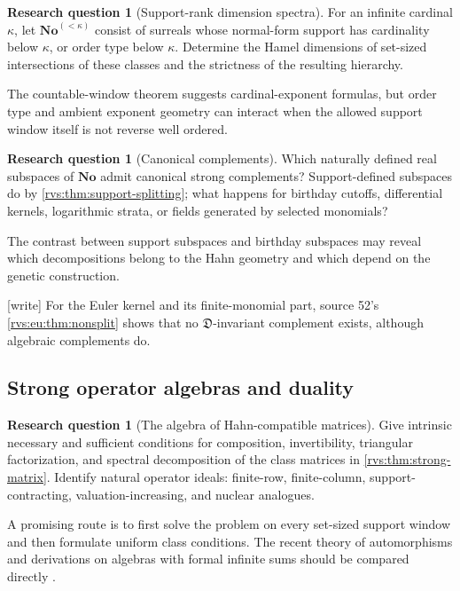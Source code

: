 \documentclass[11pt,letterpaper]{article}
\numberwithin{equation}{section}
\theoremstyle{definition}
\newtheorem{question}[theorem]{Research question}
\theoremstyle{remark}
\newcommand{\No}{\mathbf{No}}
\newcommand{\EuD}{\mathfrak D}%
\newcommand{\wtag}{\textup{[write]}}%
\begin{document}
\begin{question}[Support-rank dimension spectra]
For an infinite cardinal \(\kappa\), let \(\No^{(<\kappa)}\) consist of
surreals whose normal-form support has cardinality below \(\kappa\), or order
type below \(\kappa\).  Determine the Hamel dimensions of set-sized
intersections of these classes and the strictness of the resulting hierarchy.
\end{question}

The countable-window theorem suggests cardinal-exponent formulas, but order
type and ambient exponent geometry can interact when the allowed support
window itself is not reverse well ordered.

\begin{question}[Canonical complements]
Which naturally defined real subspaces of \(\No\) admit canonical strong
complements?  Support-defined subspaces do by \cref{rvs:thm:support-splitting};
what happens for birthday cutoffs, differential kernels, logarithmic strata,
or fields generated by selected monomials?
\end{question}

The contrast between support subspaces and birthday subspaces may reveal
which decompositions belong to the Hahn geometry and which depend on the
genetic construction.

\noindent\wtag{} For the Euler kernel and its finite-monomial part, source
52's \cref{rvs:eu:thm:nonsplit} shows that no \(\EuD\)-invariant complement
exists, although algebraic complements do.


\subsection{Strong operator algebras and duality}

\begin{question}[The algebra of Hahn-compatible matrices]
Give intrinsic necessary and sufficient conditions for composition,
invertibility, triangular factorization, and spectral decomposition of the
class matrices in \cref{rvs:thm:strong-matrix}.  Identify natural operator ideals:
finite-row, finite-column, support-contracting, valuation-increasing, and
nuclear analogues.
\end{question}

A promising route is to first solve the problem on every set-sized support
window and then formulate uniform class conditions.  The recent theory of
automorphisms and derivations on algebras with formal infinite sums should be
compared directly \cite{BagayokoEtAl}.
\end{document}
